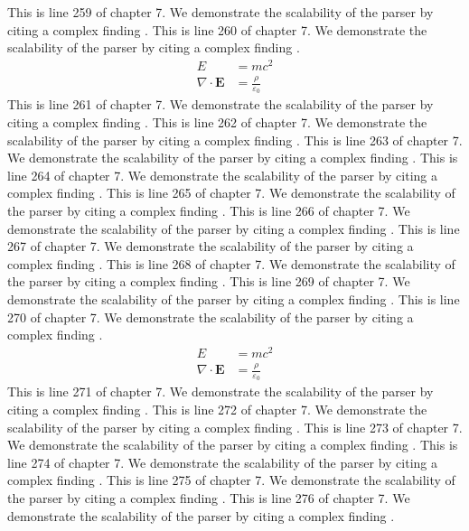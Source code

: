 This is line 259 of chapter 7. We demonstrate the scalability of the parser by citing a complex finding \cite{ref7_259}.
This is line 260 of chapter 7. We demonstrate the scalability of the parser by citing a complex finding \cite{ref7_260}.
\begin{align*}
  E &= mc^2 \\
  \nabla \cdot \mathbf{E} &= \frac{\rho}{\varepsilon_0}
\end{align*}
This is line 261 of chapter 7. We demonstrate the scalability of the parser by citing a complex finding \cite{ref7_261}.
This is line 262 of chapter 7. We demonstrate the scalability of the parser by citing a complex finding \cite{ref7_262}.
This is line 263 of chapter 7. We demonstrate the scalability of the parser by citing a complex finding \cite{ref7_263}.
This is line 264 of chapter 7. We demonstrate the scalability of the parser by citing a complex finding \cite{ref7_264}.
This is line 265 of chapter 7. We demonstrate the scalability of the parser by citing a complex finding \cite{ref7_265}.
This is line 266 of chapter 7. We demonstrate the scalability of the parser by citing a complex finding \cite{ref7_266}.
This is line 267 of chapter 7. We demonstrate the scalability of the parser by citing a complex finding \cite{ref7_267}.
This is line 268 of chapter 7. We demonstrate the scalability of the parser by citing a complex finding \cite{ref7_268}.
This is line 269 of chapter 7. We demonstrate the scalability of the parser by citing a complex finding \cite{ref7_269}.
This is line 270 of chapter 7. We demonstrate the scalability of the parser by citing a complex finding \cite{ref7_270}.
\begin{align*}
  E &= mc^2 \\
  \nabla \cdot \mathbf{E} &= \frac{\rho}{\varepsilon_0}
\end{align*}
This is line 271 of chapter 7. We demonstrate the scalability of the parser by citing a complex finding \cite{ref7_271}.
This is line 272 of chapter 7. We demonstrate the scalability of the parser by citing a complex finding \cite{ref7_272}.
This is line 273 of chapter 7. We demonstrate the scalability of the parser by citing a complex finding \cite{ref7_273}.
This is line 274 of chapter 7. We demonstrate the scalability of the parser by citing a complex finding \cite{ref7_274}.
This is line 275 of chapter 7. We demonstrate the scalability of the parser by citing a complex finding \cite{ref7_275}.
This is line 276 of chapter 7. We demonstrate the scalability of the parser by citing a complex finding \cite{ref7_276}.

